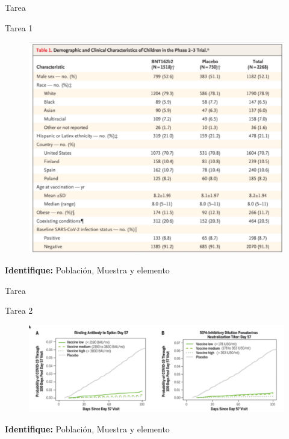 \documentclass[11pt]{beamer}
\begin{document}
    \begin{frame}{Tarea}
        \begin{block}{Tarea 1}
            \begin{figure}
                \centering
                \includegraphics[width=0.7\linewidth]{images/Lecture_1a}
                \label{fig:lecture1aa}
            \end{figure}
        \end{block}
       \textbf{ Identifique:} Población, Muestra y elemento
    \end{frame}
    \begin{frame}{Tarea}
        \begin{block}{Tarea 2}
            \begin{figure}
                \centering
                \includegraphics[width=1\linewidth]{images/Lecture_1b}
                \label{fig:lecture1bb}
            \end{figure}
        \end{block}
        \textbf{Identifique:} Población, Muestra y elemento
    \end{frame}
\end{document}
